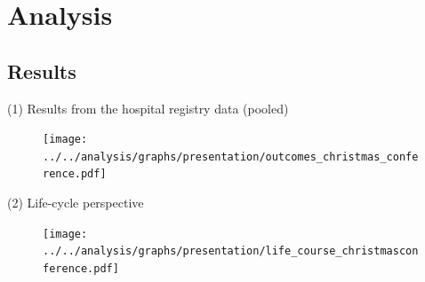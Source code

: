 \documentclass[usenames,dvipsnames]{beamer} %
\begin{document}
\section{Analysis}




\subsection{Results}
\begin{frame}{(1) Results from the hospital registry data (pooled)}

\begin{figure}\centering
\texttt{[image: ../../analysis/graphs/presentation/outcomes\_christmas\_conference.pdf]}
\end{figure}


\end{frame}
\begin{frame}{(2) Life-cycle perspective}
\label{BACK_FROM_RF}
\begin{figure}\centering
\texttt{[image: ../../analysis/graphs/presentation/life\_course\_christmasconference.pdf]}
\end{figure}
\hyperlink{RF}{}
\end{frame}








\end{document}
